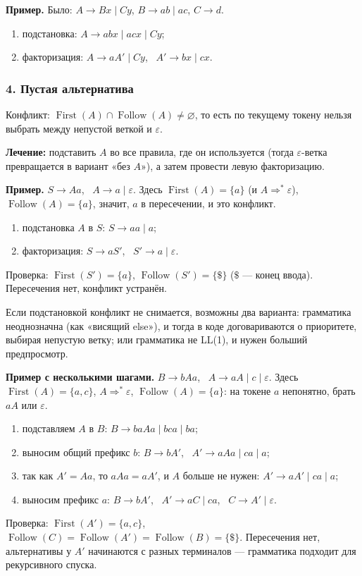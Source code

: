 \documentclass[11pt,a4paper]{article}
\newcommand{\rul}{\rightarrow}
\begin{document}
\textbf{Пример.} Было: $A\rul Bx\mid Cy$, $B\rul ab\mid ac$, $C\rul d$.
\begin{enumerate}
\item подстановка: $A\rul abx\mid acx\mid Cy$;
\item факторизация: $A\rul aA'\mid Cy$, \ $A'\rul bx\mid cx$.
\end{enumerate}

\subsubsection{4. Пустая альтернатива}
Конфликт: $\operatorname{First}(A)\cap\operatorname{Follow}(A)\ne\varnothing$, то есть по текущему токену нельзя выбрать между непустой
веткой и $\varepsilon$.

\textbf{Лечение:} подставить $A$ во все правила, где он используется (тогда $\varepsilon$-ветка превращается в вариант «без $A$»),
а затем провести левую факторизацию.

\textbf{Пример.} $S\rul Aa$, \ $A\rul a\mid\varepsilon$. Здесь $\operatorname{First}(A)=\{a\}$ (и $A\Rightarrow^*\varepsilon$),
$\operatorname{Follow}(A)=\{a\}$, значит, $a$ в пересечении, и это конфликт.
\begin{enumerate}
\item подстановка $A$ в $S$: $S\rul aa\mid a$;
\item факторизация: $S\rul aS'$, \ $S'\rul a\mid\varepsilon$.
\end{enumerate}
Проверка: $\operatorname{First}(S')=\{a\}$, $\operatorname{Follow}(S')=\{\$\}$ ($\$$ — конец ввода). Пересечения нет, конфликт устранён.

\begin{zam}
Если подстановкой конфликт не снимается, возможны два варианта: грамматика неоднозначна (как «висящий else»), и тогда в коде
договариваются о приоритете, выбирая непустую ветку; или грамматика не LL(1), и нужен больший предпросмотр.
\end{zam}

\textbf{Пример с несколькими шагами.} $B\rul bAa$, \ $A\rul aA\mid c\mid\varepsilon$. Здесь $\operatorname{First}(A)=\{a,c\}$,
$A\Rightarrow^*\varepsilon$, $\operatorname{Follow}(A)=\{a\}$: на токене $a$ непонятно, брать $aA$ или $\varepsilon$.
\begin{enumerate}
\item подставляем $A$ в $B$: $B\rul baAa\mid bca\mid ba$;
\item выносим общий префикс $b$: $B\rul bA'$, \ $A'\rul aAa\mid ca\mid a$;
\item так как $A'=Aa$, то $aAa=aA'$, и $A$ больше не нужен: $A'\rul aA'\mid ca\mid a$;
\item выносим префикс $a$: $B\rul bA'$, \ $A'\rul aC\mid ca$, \ $C\rul A'\mid\varepsilon$.
\end{enumerate}
Проверка: $\operatorname{First}(A')=\{a,c\}$, $\operatorname{Follow}(C)=\operatorname{Follow}(A')=\operatorname{Follow}(B)=\{\$\}$.
Пересечения нет, альтернативы у $A'$ начинаются с разных терминалов — грамматика подходит для рекурсивного спуска.
\end{document}
